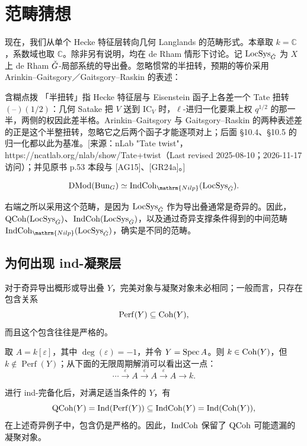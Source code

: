 \chapter{范畴猜想}\label{ch:10}
\begingroup
\setlength{\abovedisplayskip}{3pt}\setlength{\belowdisplayskip}{3pt}
\setlength{\belowdisplayshortskip}{3pt}
\setlength{\intextsep}{8pt}
现在，我们从单个 Hecke 特征层转向几何 Langlands 的范畴形式。本章取 $k=\mathbb C$，系数域也取 $\mathbb C$。除非另有说明，均在 de Rham 情形下讨论。记 $\operatorname{LocSys}_{\check{G}}$ 为 $X$ 上 de Rham $\check{G}$-局部系统的导出叠。忽略惯常的半扭转，预期的等价采用 Arinkin–Gaitsgory／Gaitsgory–Raskin 的表述\cite{AG15,GR24a}：

\begin{transnote}{含糊点拨}
「半扭转」指 Hecke 特征层与 Eisenstein 函子上各差一个 Tate 扭转 $(\text{--})(1/2)$：几何 Satake 把 $V$ 送到 $\mathrm{IC}_V$ 时，$\ell$-进归一化要乘上权 $q^{1/2}$ 的那一半，两侧的权因此差半格。Arinkin–Gaitsgory 与 Gaitsgory–Raskin 的两种表述差的正是这个半整扭转，忽略它之后两个函子才能逐项对上；后面 §10.4、§10.5 的归一化都以此为基准。[来源：nLab "Tate twist"，https://ncatlab.org/nlab/show/Tate+twist（Last revised 2025-08-10；2026-11-17 访问）；并见原书 p.53 本段与 [AG15]、[GR24a]。]
\end{transnote}
\begin{conjecture*}{}
\[\DMod(\Bun_G)\simeq\IndCoh_{\mathrm{Nilp}}(\LocSys_{\checkG}).\]
\end{conjecture*}
右端之所以采用这个范畴，是因为 $\operatorname{LocSys}_{\check{G}}$ 作为导出叠通常是奇异的。因此，$\operatorname{QCoh}(\operatorname{LocSys}_{\check{G}})$、$\operatorname{IndCoh}(\operatorname{LocSys}_{\check{G}})$，以及通过奇异支撑条件得到的中间范畴 $\IndCoh_{\mathrm{Nilp}}(\LocSys_{\checkG})$，确实是不同的范畴。

\section{为何出现 ind-凝聚层}\label{sec:10.1}
对于奇异导出概形或导出叠 $Y$，完美对象与凝聚对象未必相同；一般而言，只存在包含关系
\[\operatorname{Perf}(Y)\subseteq\operatorname{Coh}(Y),\]
而且这个包含往往是严格的。
\begin{example}
取 $A=k[\varepsilon]$，其中 $\deg(\varepsilon)=-1$，并令 $Y=\operatorname{Spec} A$。则 $k\in\operatorname{Coh}(Y)$，但 $k\notin\operatorname{Perf}(Y)$；从下面的无限周期解消可以看出这一点：
\[\cdots\xrightarrow{\varepsilon}A\xrightarrow{\varepsilon}A\xrightarrow{\varepsilon}A\longrightarrow k.\]
\end{example}
进行 ind-完备化后，对满足适当条件的 $Y$，有
\[\operatorname{QCoh}(Y)=\operatorname{Ind}(\operatorname{Perf}(Y))\subseteq\operatorname{IndCoh}(Y)=\operatorname{Ind}(\operatorname{Coh}(Y)),\]
在上述奇异例子中，包含仍是严格的。因此，$\operatorname{IndCoh}$ 保留了 $\operatorname{QCoh}$ 可能遗漏的凝聚对象。

